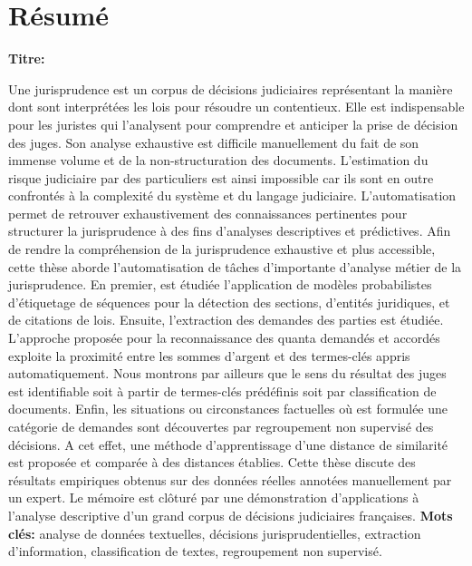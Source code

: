 \chapter*{Résumé}
\textbf{Titre:} \textsc{\titlefr}

Une jurisprudence est un corpus de décisions judiciaires représentant la manière dont sont interprétées les lois pour résoudre un contentieux. Elle est indispensable pour les juristes qui l'analysent pour comprendre et anticiper la prise de décision des juges. Son analyse exhaustive est difficile manuellement du fait de son immense volume et de la non-structuration des documents. L'estimation du risque judiciaire par des particuliers est ainsi impossible car ils sont en outre confrontés à la complexité du système et du langage judiciaire. L'automatisation permet de retrouver exhaustivement des connaissances pertinentes pour structurer la jurisprudence à des fins d'analyses descriptives et prédictives.  
Afin de rendre la compréhension de la jurisprudence exhaustive et plus accessible, cette thèse aborde l'automatisation de tâches d'importante  d'analyse métier de la jurisprudence. En premier, est étudiée l'application de modèles probabilistes d'étiquetage de séquences pour la détection des sections, d'entités juridiques, et de citations de lois. Ensuite, l'extraction des demandes des parties est étudiée.  L'approche proposée pour la reconnaissance des quanta demandés et accordés exploite la proximité entre les sommes d'argent et des termes-clés appris automatiquement. Nous montrons par ailleurs que le sens du résultat des juges est identifiable soit à partir de termes-clés prédéfinis soit par classification de documents. Enfin, les situations ou circonstances factuelles où est formulée une catégorie de demandes sont découvertes par regroupement non supervisé des décisions. A cet effet, une méthode d'apprentissage d'une distance de similarité est proposée et comparée à des distances établies.
Cette thèse discute des résultats empiriques obtenus sur des données réelles annotées manuellement par un expert. Le mémoire est clôturé par une démonstration d'applications à l'analyse descriptive d'un grand corpus de décisions judiciaires françaises.
\newline
\textbf{Mots clés:} analyse de données textuelles, décisions jurisprudentielles, extraction d'information, classification de textes, regroupement non supervisé.

